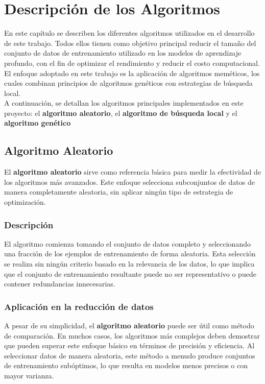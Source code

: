 
\chapter{Descripción de los Algoritmos}\label{ch:descripcion-algoritmos}
En este capítulo se describen los diferentes algoritmos utilizados en el desarrollo de este trabajo.
Todos ellos tienen como objetivo principal reducir el tamaño del conjunto de datos de entrenamiento utilizado en los
modelos de aprendizaje profundo, con el fin de optimizar el rendimiento y reducir el costo computacional.
El enfoque adoptado en este trabajo es la aplicación de algoritmos meméticos, los cuales combinan principios de
algoritmos genéticos con estrategias de búsqueda local. \\[6pt]

A continuación, se detallan los algoritmos principales implementados en este proyecto: el \textbf{algoritmo aleatorio},
el \textbf{algoritmo de búsqueda local} y el \textbf{algoritmo genético}

\section{Algoritmo Aleatorio}\label{sec:algoritmo-aleatorio}
El \textbf{algoritmo aleatorio} sirve como referencia básica para medir la efectividad de los algoritmos más avanzados.
Este enfoque selecciona subconjuntos de datos de manera completamente aleatoria, sin aplicar ningún tipo de estrategia
de optimización.

\subsection{Descripción}\label{subsec:descripcion}
El algoritmo comienza tomando el conjunto de datos completo y seleccionando una fracción de los ejemplos de
entrenamiento de forma aleatoria.
Esta selección se realiza sin ningún criterio basado en la relevancia de los datos, lo que implica que el conjunto de
entrenamiento resultante puede no ser representativo o puede contener redundancias innecesarias.

\subsection{Aplicación en la reducción de datos}\label{subsec:aplicacion-en-la-reduccion-de-datos}
A pesar de su simplicidad, el \textbf{algoritmo aleatorio} puede ser útil como método de comparación.
En muchos casos, los algoritmos más complejos deben demostrar que pueden superar este enfoque básico en términos de
precisión y eficiencia.
Al seleccionar datos de manera aleatoria, este método a menudo produce conjuntos de entrenamiento subóptimos, lo que
resulta en modelos menos precisos o con mayor varianza.

